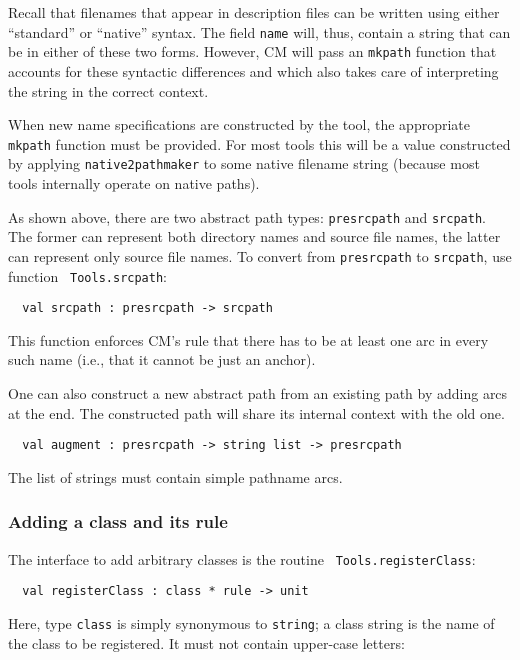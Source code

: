 Recall that filenames that appear in description files can be written
using either ``standard'' or ``native'' syntax.  The field {\tt name}
will, thus, contain a string that can be in either of these two forms.
However, CM will pass an {\tt mkpath} function that accounts for these
syntactic differences and which also takes care of interpreting the
string in the correct context.

When new name specifications are constructed by the tool, the
appropriate {\tt mkpath} function must be provided.  For most tools
this will be a value constructed by applying {\tt native2pathmaker} to
some native filename string (because most tools internally operate on
native paths).

As shown above, there are two abstract path types: {\tt presrcpath}
and {\tt srcpath}.  The former can represent both directory names and
source file names, the latter can represent only source file names.
To convert from {\tt presrcpath} to {\tt srcpath}, use function {\tt
Tools.srcpath}:
\begin{verbatim}
  val srcpath : presrcpath -> srcpath
\end{verbatim}
This function enforces CM's rule that there has to be at least one arc
in every such name (i.e., that it cannot be just an anchor).

One can also construct a new abstract path from an existing path by
adding arcs at the end.  The constructed path will share its internal
context with the old one.

\begin{verbatim}
  val augment : presrcpath -> string list -> presrcpath
\end{verbatim}

The list of strings must contain simple pathname arcs.

\subsubsection{Adding a class and its rule}

The interface to add arbitrary classes is the routine {\tt
Tools.registerClass}:

\begin{verbatim}
  val registerClass : class * rule -> unit
\end{verbatim}

Here, type {\tt class} is simply synonymous to {\tt string}; a class
string is the name of the class to be registered.  It must not contain
upper-case letters:

